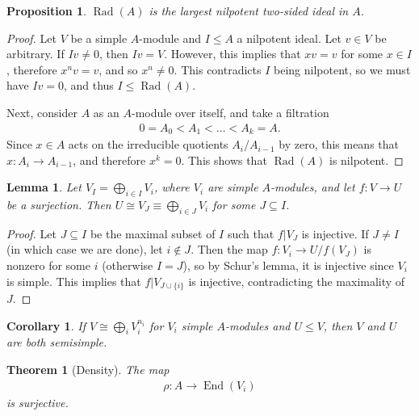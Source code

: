 \documentclass[11pt]{article}
\newtheorem{prop}{Proposition}
\newtheorem{thm}{Theorem}
\newtheorem{lem}{Lemma}
\newtheorem{cor}{Corollary}
\theoremstyle{definition}
\newcommand{\End}{\operatorname{End}}
\newcommand{\Rad}{\operatorname{Rad}}
\begin{document}
\begin{prop}
  $\Rad(A)$ is the largest nilpotent two-sided ideal in $A$.
\end{prop}

\begin{proof}
Let $V$ be a simple $A$-module and $I \leq A$ a nilpotent ideal. Let $v \in V$
be arbitrary. If $Iv \neq 0$, then $Iv = V$. However, this implies that $xv = v$
for some $x \in I$, therefore $x^nv = v$, and so $x^n \neq 0$. This contradicts
$I$ being nilpotent, so we must have $Iv = 0$, and thus $I \leq \Rad(A)$.

Next, consider $A$ as an $A$-module over itself, and take a filtration
\begin{align}
  0 = A_0 < A_1 < \ldots < A_k = A.
\end{align}
Since $x \in A$ acts on the irreducible quotients $A_i/A_{i-1}$ by zero, this
means that $x: A_i \to A_{i-1}$, and therefore $x^k = 0$. This shows that
$\Rad(A)$ is nilpotent.
\end{proof}

\begin{lem}\label{lem:funky_semisimple}
  Let $V_I = \bigoplus_{i \in I} V_i$, where $V_i$ are simple $A$-modules, and let
  $f:V \to U$ be a surjection. Then $U \cong V_J \equiv \bigoplus_{i \in J}V_i$ for some $J
  \subseteq I$.
\end{lem}

\begin{proof}
Let $J \subseteq I$ be the maximal subset of $I$ such that $f|V_J$ is injective.
If $J \neq I$ (in which case we are done), let $i \notin J$. Then the map $f:V_i
\to U/f(V_J)$ is nonzero for some $i$ (otherwise $I = J$), so by Schur's lemma,
it is injective since $V_i$ is simple. This implies that $f|V_{J \cup \{i\}}$ is
injective, contradicting the maximality of $J$.
\end{proof}

\begin{cor}
  If $V \cong \bigoplus_{i}V_i^{n_i}$ for $V_i$ simple $A$-modules and $U \leq
  V$, then $V$ and $U$ are both semisimple.
\end{cor}

\begin{thm}[Density]\label{thm:density}
 The map
 \begin{align}
   \rho: A \to \End(V_i)
 \end{align}
 is surjective.
\end{thm}
\end{document}
